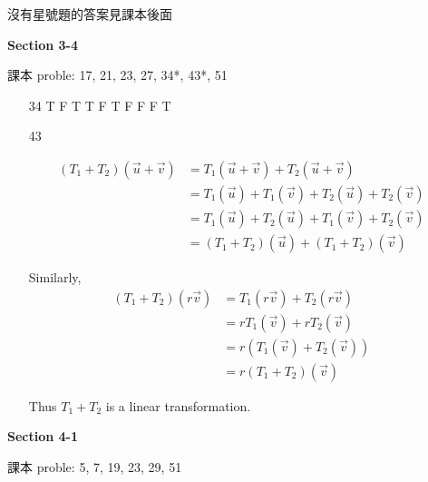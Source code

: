 \documentclass[12pt]{article}
\begin{document}
\begin{center}
沒有星號題的答案見課本後面
\end{center}



\textbf{Section 3-4} 
 
課本 proble: 17, 21, 23, 27, 34*, 43*, 51

\begin{enumerate}
\item[34] T F T T F T F F F T

\item[43]

\begin{align*}
(T_1+T_2)(\vec{u}+\vec{v})&=T_1(\vec{u}+\vec{v})+T_2(\vec{u}+\vec{v}) \\
& = T_1(\vec{u})+T_1(\vec{v})+T_2(\vec{u})+T_2(\vec{v}) \\
& = T_1(\vec{u})+T_2(\vec{u})+T_1(\vec{v})+T_2(\vec{v}) \\
&=(T_1+T_2)(\vec{u})+(T_1+T_2)(\vec{v})&
\end{align*}

Similarly,
\begin{align*}
(T_1+T_2)(r\vec{v})&=T_1(r\vec{v})+T_2(r\vec{v}) \\
& = rT_1(\vec{v})+rT_2(\vec{v}) \\
& = r(T_1(\vec{v})+T_2(\vec{v})) \\
&=r(T_1+T_2)(\vec{v})&
\end{align*}

Thus $T_1+T_2$ is a linear transformation.
\end{enumerate}

\textbf{Section 4-1} 
 
課本 proble: 5, 7, 19, 23, 29, 51
\end{document}
